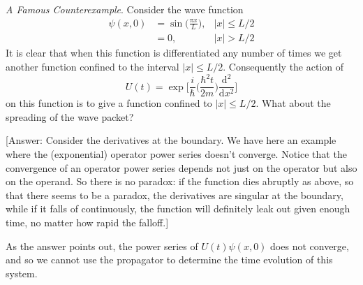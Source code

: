 \documentclass[../principles-of-quantum-mechanics.tex]{subfiles}
\begin{document}
\begin{questions}
		\question \textit{A Famous Counterexample}. Consider the wave function
		\begin{align*}
			\psi(x, 0) &= \sin\Big(\frac{\pi x}{L}\Big), &|x| \leq L/2 \\
			&= 0, &|x| > L/2
		\end{align*}
		It is clear that when this function is differentiated any number of times we get another function confined to the interval $|x| \leq L/2$. Consequently the action of
		$$U(t) = \exp\Big[\frac{i}{\hbar}\Big(\frac{\hbar^2t}{2m}\Big)\frac{\mathrm{d}^2}{\mathrm{d}x^2}\Big]$$
		on this function is to give a function confined to $|x| \leq L/2$. What about the spreading of the wave packet?
		
		[Answer: Consider the derivatives at the boundary. We have here an example where the (exponential) operator power series doesn't converge. Notice that the convergence of an operator power series depends not just on the operator but also on the operand. So there is no paradox: if the function dies abruptly as above, so that there seems to be a paradox, the derivatives are singular at the boundary, while if it falls of continuously, the function will definitely leak out given enough time, no matter how rapid the falloff.]
		\begin{solution}
			As the answer points out, the power series of $U(t)\psi(x, 0)$ does not converge, and so we cannot use the propagator to determine the time evolution of this system.
		\end{solution}
	
	\setcounter{subsection}{1}
	\setcounter{question}{0}

\end{questions}
\end{document}
